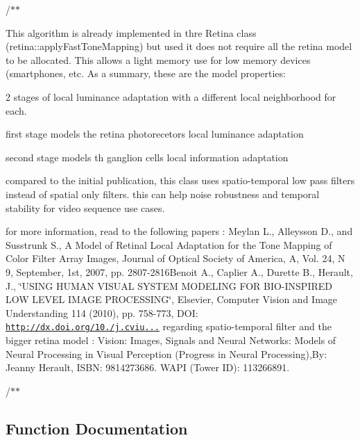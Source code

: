 /$\ast$$\ast$

This algorithm is already implemented in thre Retina class (retina\+::apply\+Fast\+Tone\+Mapping) but used it does not require all the retina model to be allocated. This allows a light memory use for low memory devices (smartphones, etc. As a summary, these are the model properties\+:
\begin{DoxyItemize}
\item 2 stages of local luminance adaptation with a different local neighborhood for each.
\item first stage models the retina photorecetors local luminance adaptation
\item second stage models th ganglion cells local information adaptation
\item compared to the initial publication, this class uses spatio-\/temporal low pass filters instead of spatial only filters. this can help noise robustness and temporal stability for video sequence use cases. 
\end{DoxyItemize}

for more information, read to the following papers \+: Meylan L., Alleysson D., and Susstrunk S., A Model of Retinal Local Adaptation for the Tone Mapping of Color Filter Array Images, Journal of Optical Society of America, A, Vol. 24, N 9, September, 1st, 2007, pp. 2807-\/2816\+Benoit A., Caplier A., Durette B., Herault, J., \char`\"{}\+U\+S\+I\+N\+G H\+U\+M\+A\+N V\+I\+S\+U\+A\+L S\+Y\+S\+T\+E\+M M\+O\+D\+E\+L\+I\+N\+G F\+O\+R B\+I\+O-\/\+I\+N\+S\+P\+I\+R\+E\+D L\+O\+W L\+E\+V\+E\+L I\+M\+A\+G\+E P\+R\+O\+C\+E\+S\+S\+I\+N\+G\char`\"{}, Elsevier, Computer Vision and Image Understanding 114 (2010), pp. 758-\/773, D\+OI\+: \href{http://dx.doi.org/10.1016/j.cviu.2010.01.011}{\tt http\+://dx.\+doi.\+org/10./j.\+cviu...} regarding spatio-\/temporal filter and the bigger retina model \+: Vision\+: Images, Signals and Neural Networks\+: Models of Neural Processing in Visual Perception (Progress in Neural Processing),By\+: Jeanny Herault, I\+S\+BN\+: 9814273686. W\+A\+PI (Tower ID)\+: 113266891.

/$\ast$$\ast$ 

\subsection{Function Documentation}
\mbox{\label{group__bioinspired_gad50e4058a5005de5c1c5bdb255b02702}} 
